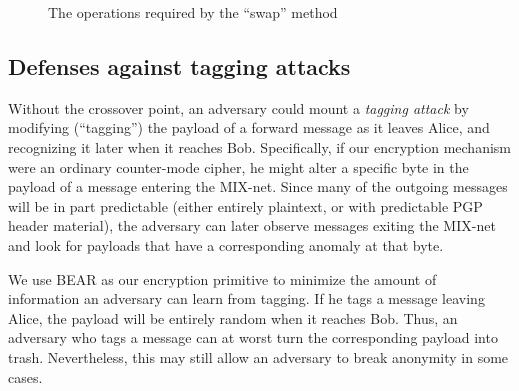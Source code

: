 \documentclass{llncs}
\begin{document}
\begin{figure}
\begin{center}
\caption{The operations required by the ``swap'' method} 
\end{center}
\end{figure}


\subsection{Defenses against tagging attacks}
\label{subsec:tagging}


Without the crossover point, an adversary could mount a \emph{tagging
attack} by modifying (``tagging'') the payload of a forward message as
it leaves Alice, and recognizing it later when it reaches Bob.
Specifically, if our encryption mechanism were an ordinary
counter-mode cipher, he might alter a specific byte in the payload of
a message entering the MIX-net. Since many of the outgoing messages
will be in part predictable (either entirely plaintext, or with
predictable PGP header material), the adversary can later observe
messages exiting the MIX-net and look for payloads that have a
corresponding anomaly at that byte.


We use BEAR as our encryption primitive to minimize the amount of
information an adversary can learn from tagging. If he tags a message
leaving Alice, the payload will be entirely random when it reaches
Bob.  Thus, an adversary who tags a message can at worst turn the
corresponding payload into trash.  
Nevertheless, this may still allow an adversary to
break anonymity in some cases.
\end{document}
